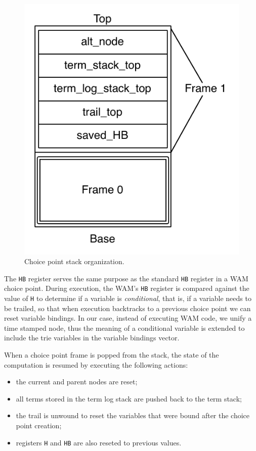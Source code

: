 \begin{figure}[ht]
  \centering
    \includegraphics[scale=0.45]{choice_point_stack.pdf}
  \caption{Choice point stack organization.}
  \label{fig:choice_point_stack}
\end{figure}

The \texttt{HB} register serves the same purpose as the standard \texttt{HB} register in a WAM choice point.
During execution, the WAM's \texttt{HB} register is compared against the value of \texttt{H} to determine
if a variable is \textit{conditional}, that is, if a variable needs to be trailed, so that
when execution backtracks to a previous choice
point we can reset variable bindings. In our case, instead of executing WAM code, we unify a time stamped node,
thus the meaning of a conditional variable is extended to include the trie variables in the variable bindings vector.

When a choice point frame is popped from the stack, the state of the computation is resumed
by executing the following actions:

\begin{itemize}
  \item the current and parent nodes are reset;
  \item all terms stored in the term log stack are pushed back to the term stack;
  \item the trail is unwound to reset the variables that were bound after the choice point creation;
  \item registers \texttt{H} and \texttt{HB} are also reseted to previous values.
\end{itemize}


